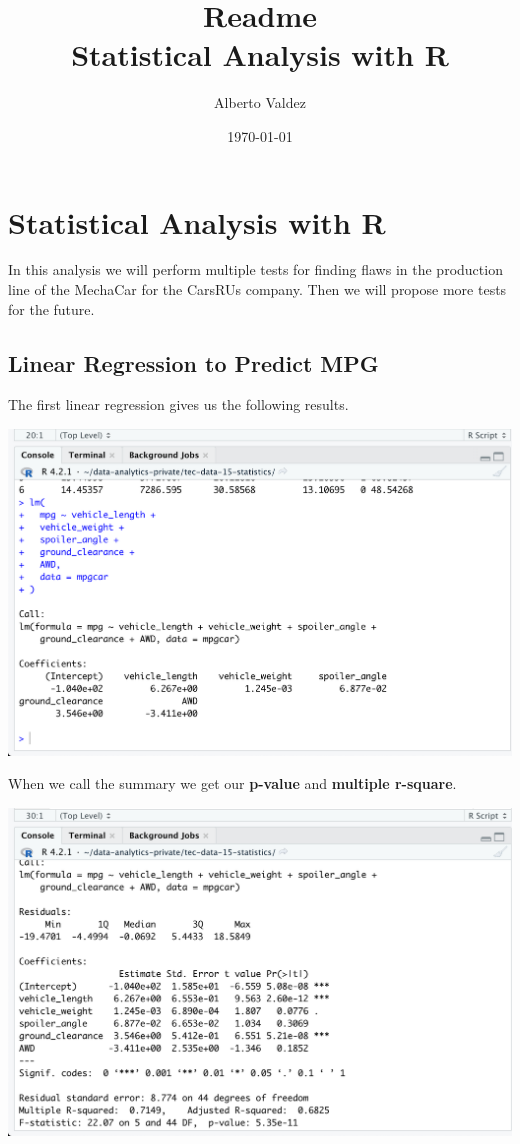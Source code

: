 \documentclass[11pt]{article}
\author{Alberto Valdez}
\date{\today}
\title{Readme\\\medskip
\large Statistical Analysis with R}
\begin{document}
\maketitle
\tableofcontents


\section{Statistical Analysis with R}
\label{sec:org46c7723}

In this analysis we will perform multiple tests for finding flaws in the production line of the MechaCar for the CarsRUs company. Then we will propose more tests for the future.

\subsection{Linear Regression to Predict MPG}
\label{sec:org87e7c72}

The first linear regression gives us the following results.

\begin{center}
\includegraphics[width=.9\linewidth]{./resources/_r_1.png}
\end{center}

When we call the summary we get our \textbf{p-value} and \textbf{multiple r-square}.

\begin{center}
\includegraphics[width=.9\linewidth]{./resources/_r_1b.png}
\end{center}
\end{document}
